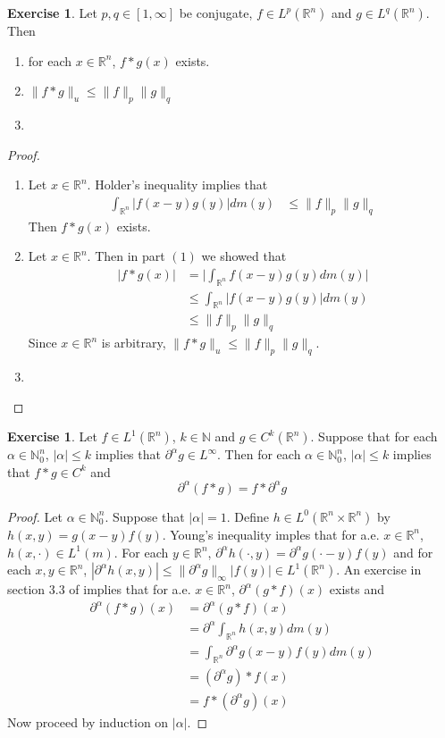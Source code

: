 \documentclass[12pt]{amsart}
\theoremstyle{definition}
\newtheorem{ex}[definition]{Exercise}
\newcommand{\p}{\partial}
\newcommand{\al}{\alpha}
\newcommand{\N}{\mathbb{N}}
\newcommand{\R}{\mathbb{R}}
\newcommand{\lex}[1]{\label{ex:#1}}
\begin{document}
	\begin{ex}
	\lex{205} Let $p, q \in [1, \infty]$ be conjugate, $f \in L^p(\R^n)$ and $g \in L^q(\R^n)$. Then 
	\begin{enumerate}
	\item for each $x \in \R^n$, $f * g(x)$ exists. 
	\item $\|f*g\|_u \leq \|f\|_p \|g\|_q $
	\item 
	\end{enumerate}
	\end{ex}
	
	\begin{proof}
	\begin{enumerate}
	\item Let $x \in \R^n$. Holder's inequality implies that 
	\begin{align*}
	\int_{\R^n}|f(x-y)g(y)| dm(y) 
	& \leq \|f\|_p \|g\|_q 
	\end{align*}
	Then $f*g(x)$ exists. 
	\item Let $x \in \R^n$. Then in part $(1)$ we showed that  
	\begin{align*}
	|f*g(x)| 
	&= \bigg| \int_{\R^n} f(x - y)g(y) dm(y)\bigg| \\
	&\leq  \int_{\R^n} |f(x-y)g(y)| dm(y) \\
	& \leq \|f\|_p \|g\|_q
	\end{align*}
	Since $x \in \R^n$ is arbitrary, $\|f*g\|_u \leq \|f\|_p \|g\|_q $.
	\item 
	\end{enumerate}
	\end{proof}
	
	\begin{ex}
	\lex{206} Let $f \in L^1(\R^n)$, $k \in \N$ and $g \in C^k(\R^n)$. Suppose that for each $\al \in \N_0^n$, $|\al| \leq k$ implies that $\p^{\al} g \in L^{\infty}$. Then for each $\al \in \N_0^n$, $|\al| \leq k$ implies that $f *  g \in C^{k}$ and $$\p^{\al}(f*g) = f*\p^{\al}g$$
	\end{ex}
	
	\begin{proof}
	Let $\al \in \N_0^n$. Suppose that $|\al| = 1$. Define $h \in L^0(\R^n \times \R^n)$ by $h(x,y) = g(x-y)f(y)$. Young's inequality imples that for a.e. $ x \in \R^n$, $h(x, \cdot) \in L^1(m)$. For each $y \in \R^n$, $\p^{\al} h (\cdot,y) = \p^{\al}g(\cdot -y)f(y)$ and for each $x,y \in \R^n$, $|\p^{\al} h (x,y)| \leq \|\p^{\al} g\|_{\infty}|f(y)| \in L^1(\R^n)$. An exercise in section $3.3$ of 
	\cite{measure}
	implies that for a.e. $x \in \R^n$, $\p^{\al} (g*f)(x)$ exists and 
	\begin{align*}
	\p^{\al} (f*g)(x) 
	&= \p^{\al} (g * f)(x) \\
	&= \p^{\al}\int_{\R^n} h(x,y) dm(y) \\
	&= \int_{\R^n} \p^{\al} g(x -y)f(y) dm(y) \\
	&= (\p^{\al} g) * f (x) \\
	&=  f * (\p^{\al} g) (x)   
	\end{align*}	 
	Now proceed by induction on $|\al|$.
	\end{proof}
	
\end{document}
